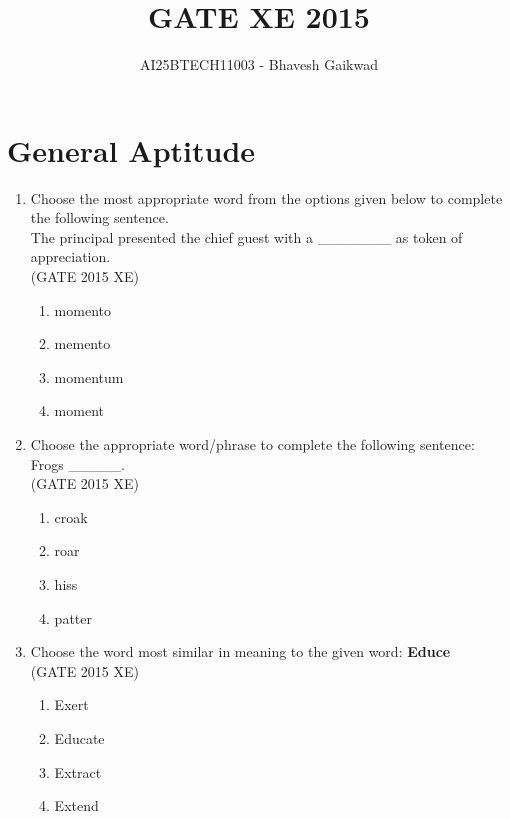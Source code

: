 \documentclass[journal,12pt,onecolumn]{IEEEtran}
\begin{document}
\title{GATE XE 2015}
\author{AI25BTECH11003 - Bhavesh Gaikwad}
\maketitle

\section*{General Aptitude}
\bigskip
\begin{enumerate}

\item Choose the most appropriate word from the options given below to complete the following sentence.\\
The principal presented the chief guest with a \_\_\_\_\_\_\_ as token of appreciation. \\
\hfill{(GATE 2015 XE)} 
\begin{multicols}{4}
\begin{enumerate}
\item momento
\item memento
\item momentum
\item moment
\end{enumerate}
\end{multicols}



\item Choose the appropriate word/phrase to complete the following sentence: 
Frogs \_\_\_\_\_.  \\
\hfill{(GATE 2015 XE)} 

\begin{multicols}{4}
\begin{enumerate}
\item croak
\item roar
\item hiss
\item patter
\end{enumerate}
\end{multicols}


\item Choose the word most similar in meaning to the given word: \textbf{Educe}  \\
\hfill{(GATE 2015 XE)}

\begin{multicols}{4}
\begin{enumerate}
\item Exert
\item Educate
\item Extract
\item Extend
\end{enumerate}
\end{multicols}



\end{enumerate}
\end{document}
